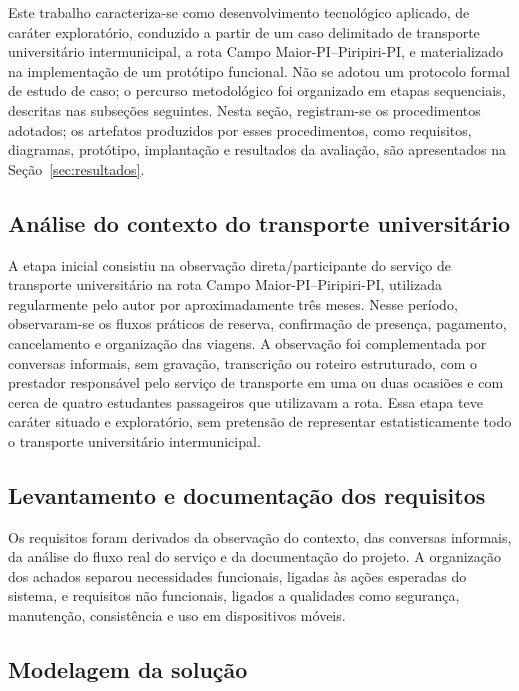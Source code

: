 \documentclass[a4paper,12pt]{article}
\begin{document}
Este trabalho caracteriza-se como desenvolvimento tecnológico aplicado, de caráter exploratório, conduzido a partir de um caso delimitado de transporte universitário intermunicipal, a rota Campo Maior-PI--Piripiri-PI, e materializado na implementação de um protótipo funcional. Não se adotou um protocolo formal de estudo de caso; o percurso metodológico foi organizado em etapas sequenciais, descritas nas subseções seguintes. Nesta seção, registram-se os procedimentos adotados; os artefatos produzidos por esses procedimentos, como requisitos, diagramas, protótipo, implantação e resultados da avaliação, são apresentados na Seção~\ref{sec:resultados}.

\subsection{Análise do contexto do transporte universitário}

A etapa inicial consistiu na observação direta/participante do serviço de transporte universitário na rota Campo Maior-PI--Piripiri-PI, utilizada regularmente pelo autor por aproximadamente três meses. Nesse período, observaram-se os fluxos práticos de reserva, confirmação de presença, pagamento, cancelamento e organização das viagens. A observação foi complementada por conversas informais, sem gravação, transcrição ou roteiro estruturado, com o prestador responsável pelo serviço de transporte em uma ou duas ocasiões e com cerca de quatro estudantes passageiros que utilizavam a rota. Essa etapa teve caráter situado e exploratório, sem pretensão de representar estatisticamente todo o transporte universitário intermunicipal.

\subsection{Levantamento e documentação dos requisitos}
\label{sec:metodo-requisitos}

Os requisitos foram derivados da observação do contexto, das conversas informais, da análise do fluxo real do serviço e da documentação do projeto. A organização dos achados separou necessidades funcionais, ligadas às ações esperadas do sistema, e requisitos não funcionais, ligados a qualidades como segurança, manutenção, consistência e uso em dispositivos móveis.

\subsection{Modelagem da solução}
\label{sec:metodo-modelagem}
\end{document}

